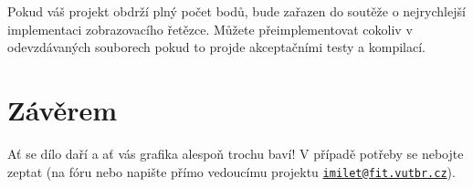Pokud váš projekt obdrží plný počet bodů, bude zařazen do soutěže o nejrychlejší implementaci zobrazovacího řetězce. Můžete přeimplementovat cokoliv v odevzdávaných souborech pokud to projde akceptačními testy a kompilací.\hypertarget{index_zaver}{}\section{Závěrem}\label{index_zaver}
Ať se dílo daří a ať vás grafika alespoň trochu baví! V případě potřeby se nebojte zeptat (na fóru nebo napište přímo vedoucímu projektu \href{mailto:imilet@fit.vutbr.cz}{\tt imilet@fit.\+vutbr.\+cz}). 
